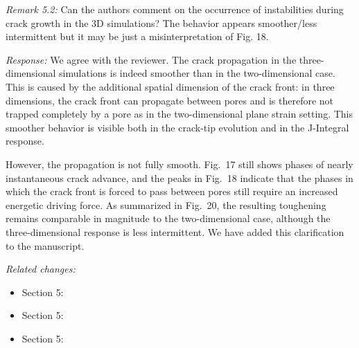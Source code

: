\documentclass[pdflatex,sn-mathphys-num]{sn-jnl}
\begin{document}
\emph{Remark 5.2:} Can the authors comment on the occurrence of instabilities during crack growth in the 3D simulations? The behavior appears smoother/less intermittent but it may be just a misinterpretation of Fig. 18.

\emph{Response:} We agree with the reviewer. The crack propagation in the three-dimensional simulations is indeed smoother than in the two-dimensional case. This is caused by the additional spatial dimension of the crack front: in three dimensions, the crack front can propagate between pores and is therefore not trapped completely by a pore as in the two-dimensional plane strain setting. This smoother behavior is visible both in the crack-tip evolution and in the J-Integral response.

However, the propagation is not fully smooth. Fig.~17 still shows phases of nearly instantaneous crack advance, and the peaks in Fig.~18 indicate that the phases in which the crack front is forced to pass between pores still require an increased energetic driving force. As summarized in Fig.~20, the resulting toughening remains comparable in magnitude to the two-dimensional case, although the three-dimensional response is less intermittent. We have added this clarification to the manuscript.

\emph{Related changes:}
\begin{itemize}
\item Section 5: 
\item Section 5: 
\item Section 5: 
\end{itemize}
\end{document}
